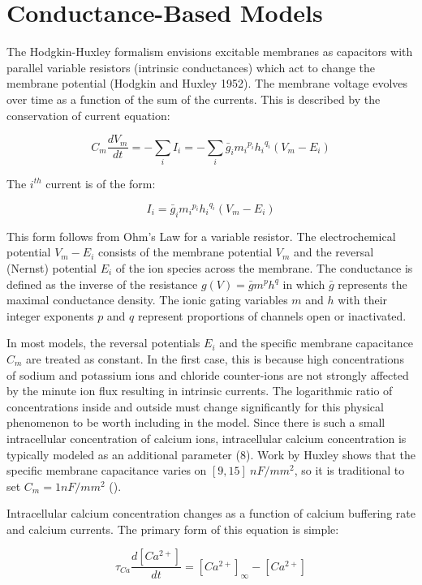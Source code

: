 \documentclass[14pt]{article}
\begin{document}
	\section{Conductance-Based Models}
	The Hodgkin-Huxley formalism envisions excitable membranes as capacitors with parallel variable resistors (intrinsic conductances) which act to change the membrane potential (Hodgkin and Huxley 1952). The membrane voltage evolves over time as a function of the sum of the currents. This is described by the conservation of current equation:
	
	\[C_m \frac{dV_m}{dt} = - \sum_{i} I_i = - \sum_{i} \bar{g}_{i} {m_i}^{p_i} {h_i}^{q_i} (V_m - E_i) \]
	
	The $i^{th}$ current is of the form:
	
	\[I_i = \bar{g}_{i} {m_i}^{p_i} {h_i}^{q_i} (V_m - E_i)\]
	
	This form follows from Ohm’s Law for a variable resistor. The electrochemical potential $V_m - E_i$ consists of the membrane potential $V_m$ and the reversal (Nernst) potential $E_i$ of the ion species across the membrane. The conductance is defined as the inverse of the resistance $g(V) = \bar{g} m^p h^q$ in which $\bar{g}$ represents the maximal conductance density. The ionic gating variables $m$ and $h$ with their integer exponents $p$ and $q$ represent proportions of channels open or inactivated.
	
	In most models, the reversal potentials $E_i$ and the specific membrane capacitance $C_m$ are treated as constant. In the first case, this is because high concentrations of sodium and potassium ions and chloride counter-ions are not strongly affected by the minute ion flux resulting in intrinsic currents. The logarithmic ratio of concentrations inside and outside must change significantly for this physical phenomenon to be worth including in the model. Since there is such a small intracellular concentration of calcium ions, intracellular calcium concentration is typically modeled as an additional parameter (\cite{Liumodelneuronactivitydependent1998}8). Work by Huxley shows that the specific membrane capacitance varies on $[9,15] ~nF/mm^2$, so it is traditional to set $C_m =  1 nF/mm^2$ (\cite{Hodgkinquantitativedescriptionmembrane1952,HilleIonChannelsExcitable2001}).
	
	Intracellular calcium concentration changes as a function of calcium buffering rate and calcium currents. The primary form of this equation is simple:
	
	\[\tau_{Ca} \frac{d[Ca^{2+}]}{dt} = [Ca^{2+}]_{\infty} - [Ca^{2+}] \]
	
\end{document}
